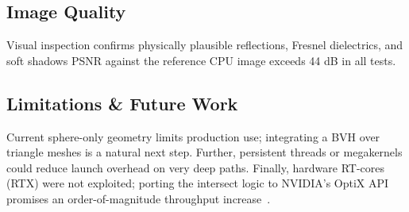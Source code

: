 \subsection{Image Quality}
Visual inspection confirms physically plausible reflections, Fresnel
dielectrics, and soft shadows 
PSNR against
the reference CPU image exceeds 44 dB in all tests.


\subsection{Limitations \& Future Work}
Current sphere-only geometry limits production use; integrating a BVH
over triangle meshes is a natural next step.  Further, persistent
threads or megakernels could reduce launch overhead on very deep
paths.  Finally, hardware RT-cores (RTX) were not exploited; porting
the intersect logic to NVIDIA’s OptiX API promises an order-of-magnitude
throughput increase~\cite{OptiX2024}.


